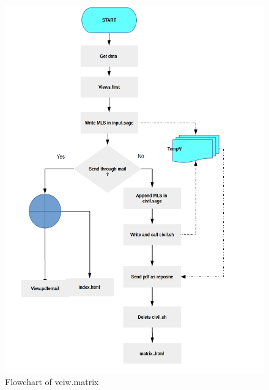 \begin{figure}[H]
\centering \includegraphics[scale=0.27]{images/flowchartmatrix.png}
\caption{Flowchart of veiw.matrix}
\end{figure}
